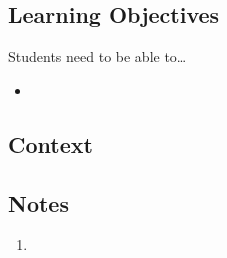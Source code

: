 \subsection*{Learning Objectives}
Students need to be able to\ldots
\begin{itemize}
	\item  
\end{itemize}

\subsection*{Context}

\subsection*{Notes}
\begin{enumerate}
	\item 
\end{enumerate}